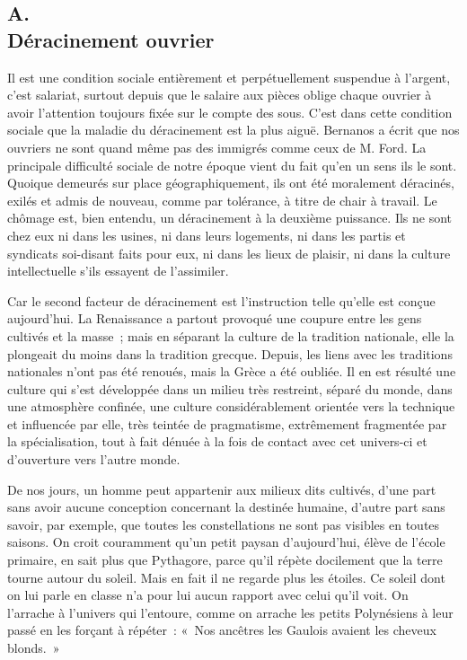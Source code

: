 \documentclass[french,twoside]{book} %
\begin{document}
\subsection[A. Déracinement ouvrier]{A. \\
Déracinement ouvrier}
\noindent \par
Il est une condition sociale entièrement et perpétuellement suspendue à l'argent, c'est salariat, surtout depuis que le salaire aux pièces oblige chaque ouvrier à avoir l'attention toujours fixée sur le compte des sous. C'est dans cette condition sociale que la maladie du déracinement est la plus aiguë. Bernanos a écrit que nos ouvriers ne sont quand même pas des immigrés comme ceux de M. Ford. La principale difficulté sociale de notre époque vient du fait qu'en un sens ils le sont. Quoique demeurés sur place géographiquement, ils ont été moralement déracinés, exilés et admis de nouveau, comme par tolérance, à titre de chair à travail. Le chômage est, bien entendu, un déracinement à la deuxième puissance. Ils ne sont chez eux ni dans les usines, ni dans leurs logements, ni dans les partis et syndicats soi-disant faits pour eux, ni dans les lieux de plaisir, ni dans la culture intellectuelle s'ils essayent de l'assimiler.\par
Car le second facteur de déracinement est l’instruction telle qu'elle est conçue aujourd'hui. La Renaissance a partout provoqué une coupure entre les gens cultivés et la masse ; mais en séparant la culture de la tradition nationale, elle la plongeait du moins dans la tradition grecque. Depuis, les liens avec les traditions nationales n'ont pas été renoués, mais la Grèce a été oubliée. Il en est résulté une culture qui s'est développée dans un milieu très restreint, séparé du monde, dans une atmosphère confinée, une culture considérablement orientée vers la technique et influencée par elle, très teintée de pragmatisme, extrêmement fragmentée par la spécialisation, tout à fait dénuée à la fois de contact avec cet univers-ci et d'ouverture vers l'autre monde.\par
De nos jours, un homme peut appartenir aux milieux dits cultivés, d'une part sans avoir aucune conception concernant la destinée humaine, d'autre part sans savoir, par exemple, que toutes les constellations ne sont pas visibles en toutes saisons. On croit couramment qu’un petit paysan d'aujourd'hui, élève de l'école primaire, en sait plus que Pythagore, parce qu'il répète docilement que la terre tourne autour du soleil. Mais en fait il ne regarde plus les étoiles. Ce soleil dont on lui parle en classe n'a pour lui aucun rapport avec celui qu'il voit. On l'arrache à l'univers qui l'entoure, comme on arrache les petits Polynésiens à leur passé en les forçant à répéter : « Nos ancêtres les Gaulois avaient les cheveux blonds. »\par
\end{document}
